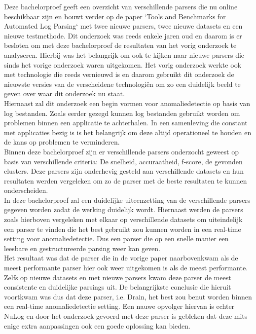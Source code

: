 Deze bachelorproef geeft een overzicht van verschillende parsers die nu online beschikbaar zijn en bouwt verder op de paper `Tools and Benchmarks for Automated Log Parsing` \autocite{TBA2019} met twee nieuwe parsers, twee nieuwe datasets en een nieuwe testmethode. Dit onderzoek was reeds enkele jaren oud en daarom is er besloten om met deze bachelorproef de resultaten van het vorig onderzoek te analyseren. Hierbij was het belangrijk om ook te kijken naar nieuwe parsers die sinds het vorige onderzoek waren uitgekomen. Het vorig onderzoek werkte ook met technologie die reeds vernieuwd is en daarom gebruikt dit onderzoek de nieuwste versies van de verscheidene technologiën om zo een duidelijk beeld te geven over waar dit onderzoek nu staat.\\

Hiernaast zal dit onderzoek een begin vormen voor anomaliedetectie op basis van log bestanden. Zoals eerder gezegd kunnen log bestanden gebruikt worden om problemen binnen een applicatie te achterhalen. In een samenleving die constant met applicaties bezig is is het belangrijk om deze altijd operationeel te houden en de kans op problemen te verminderen.\\

Binnen deze bachelorproef zijn er verschillende parsers onderzocht geweest op basis van verschillende criteria: De snelheid, accuraatheid, f-score, de gevonden clusters. Deze parsers zijn onderhevig gesteld aan verschillende datasets en hun resultaten werden vergeleken om zo de parser met de beste resultaten te kunnen onderscheiden.\\

In deze bachelorproef zal een duidelijke uiteenzetting van de verschillende parsers gegeven worden zodat de werking duidelijk wordt. Hiernaast werden de parsers zoals hierboven vergeleken met elkaar op verschillende datasets om uiteindelijk een parser te vinden die het best gebruikt zou kunnen worden in een real-time setting voor anomaliedetectie. Dus een parser die op een snelle manier een leesbare en gestructureerde parsing weer kan geven.\\

Het resultaat was dat de parser die in de vorige paper naarbovenkwam als de meest performante parser hier ook weer uitgekomen is als de meest performante. Zelfs op nieuwe datasets en met nieuwe parsers kwam deze parser de meest consistente en duidelijke parsings uit.
De belangrijkste conclusie die hieruit voortkwam was dus dat deze parser, i.e. Drain, het best zou benut worden binnen een real-time anomaliedetectie setting. Een nauwe opvolger hiervan is echter NuLog en door het onderzoek gevoerd met deze parser is gebleken dat deze mits enige extra aanpassingen ook een goede oplossing kan bieden.\\

